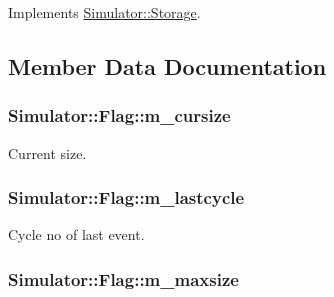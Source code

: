 Implements \hyperlink{class_simulator_1_1_storage_abea2bd330384970436228e1a759b9239}{Simulator\+::\+Storage}.



\subsection{Member Data Documentation}
\hypertarget{class_simulator_1_1_flag_a67bdcf6e60428f27966068a8d472c868}{
\subsubsection[{m\+\_\+cursize}]{ Simulator\+::\+Flag\+::m\+\_\+cursize\hspace{0.3cm}{\ttfamily [protected]}}}\label{class_simulator_1_1_flag_a67bdcf6e60428f27966068a8d472c868}


Current size. 

\hypertarget{class_simulator_1_1_flag_a036d407f68f820d78ecb30072af3c429}{
\subsubsection[{m\+\_\+lastcycle}]{ Simulator\+::\+Flag\+::m\+\_\+lastcycle\hspace{0.3cm}{\ttfamily [protected]}}}\label{class_simulator_1_1_flag_a036d407f68f820d78ecb30072af3c429}


Cycle no of last event. 

\hypertarget{class_simulator_1_1_flag_ad7d35060575d980cd0532240fc61d177}{
\subsubsection[{m\+\_\+maxsize}]{ Simulator\+::\+Flag\+::m\+\_\+maxsize\hspace{0.3cm}{\ttfamily [protected]}}}\label{class_simulator_1_1_flag_ad7d35060575d980cd0532240fc61d177}


